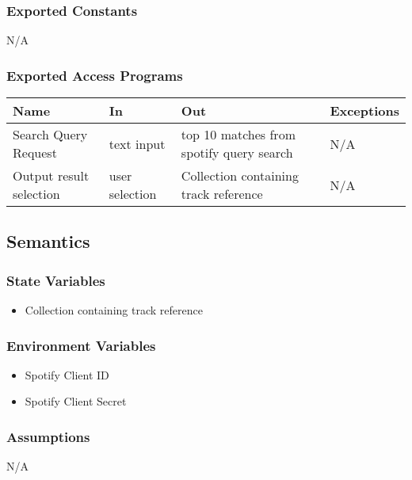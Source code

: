 \documentclass[12pt, titlepage]{article}
\begin{document}
\subsubsection{Exported Constants}
N/A

\subsubsection{Exported Access Programs}

\begin{center}
\begin{tabular}{p{2cm} p{4cm} p{4cm} p{2cm}}
\hline
\textbf{Name} & \textbf{In} & \textbf{Out} & \textbf{Exceptions}\\
\hline%
Search Query Request &text input &top 10 matches from spotify query search &N/A\\
Output result selection &user selection &Collection containing track reference &N/A\\
\hline
\end{tabular}
\end{center}

\subsection{Semantics}

\subsubsection{State Variables}
\begin{itemize}
  \item Collection containing track reference
\end{itemize}

\subsubsection{Environment Variables}
\begin{itemize}
  \item Spotify Client ID
  \item Spotify Client Secret
\end{itemize}

\subsubsection{Assumptions}
N/A
\end{document}
